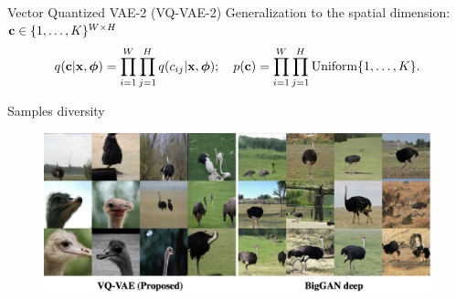 \begin{frame}{Vector Quantized VAE-2  (VQ-VAE-2)}
	Generalization to the spatial dimension: $\mathbf{c} \in \{1, \dots, K\}^{W \times H}$
	\vspace{-0.3cm}
	\[
		q(\mathbf{c} | \mathbf{x}, \boldsymbol{\phi}) = \prod_{i=1}^W \prod_{j=1}^H q(c_{ij} | \mathbf{x}, \boldsymbol{\phi}); \quad p(\mathbf{c}) = \prod_{i=1}^W \prod_{j=1}^H \text{Uniform}\{1, \dots, K\}.
	\]
	\vspace{-0.6cm}
	\begin{block}{Samples diversity}
		\vspace{-0.2cm}
		\begin{figure}
			\centering
			\includegraphics[width=1.0\linewidth]{figs/vqvae2_diversity}
		\end{figure}
	\end{block}
\end{frame}
